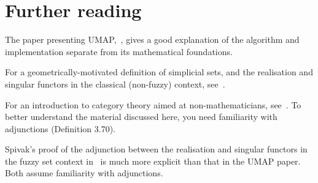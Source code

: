 \documentclass[a4paper,11pt,leqno]{article} \usepackage{amsmath}
\theoremstyle{definition}
\begin{document}
\section{Further reading}

The paper presenting UMAP,~\cite{McInnes18}, gives a good explanation of the
algorithm and implementation separate from its mathematical foundations.

For a geometrically-motivated definition of simplicial sets, and the realisation
and singular functors in the classical (non-fuzzy) context,
see~\cite{Friedman08}.

For an introduction to category theory aimed at non-mathematicians,
see~\cite{Spivak18}.
To better understand the material discussed here, you need familiarity with
adjunctions (Definition 3.70).

Spivak's proof of the adjunction between the realisation and singular functors
in the fuzzy set context in~\cite{Spivak} is much more explicit than that in the
UMAP paper.
Both assume familiarity with adjunctions.
\end{document}
